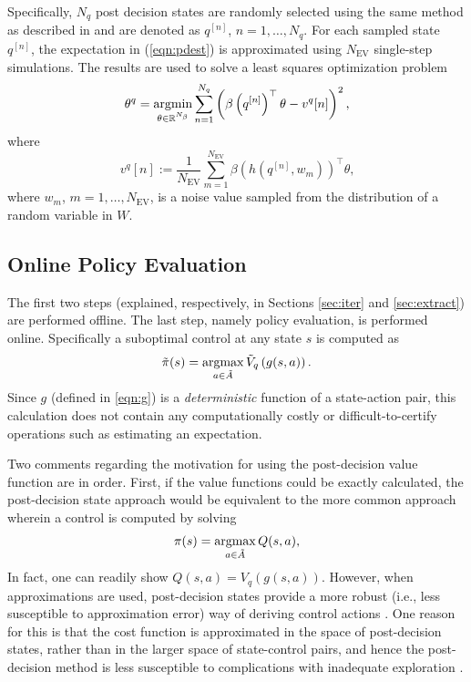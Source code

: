 Specifically, $N_q$ post decision states are randomly selected using the same method as described in  and are denoted as $q^{[n]}$, $n=1,\ldots, N_q$. For each sampled state $q^{[n]}$, the expectation in (\ref{eqn:pdest}) is approximated using $N_{\text{EV}}$ single-step simulations. The results are used to solve a least squares optimization problem
\begin{equation}
    \theta^q = \underset{\theta \in \reals^{N_{\beta}}}{\argmin} \sum_{n=1}^{N_q} \left( \beta \left(q^{[n]}\right)^\top \theta - v^q[n]\right) ^2 \text{,}
\end{equation}
where
\begin{equation}
    v^q[n] := \frac{1}{N_{\text{EV}}} \sum_{m=1}^{N_{\text{EV}}} \beta\left(h\left(q^{[n]},w_m\right)\right)^\top \theta \text{,}
\end{equation}
where $w_m$, $m=1,\dots,N_\text{EV}$, is a noise value sampled from the distribution of a random variable in $W$.


\subsection{Online Policy Evaluation} \label{sec:policy}

The first two steps (explained, respectively, in Sections \ref{sec:iter} and \ref{sec:extract}) are performed offline. The last step, namely policy evaluation, is performed online. Specifically a suboptimal control at any state $s$ is computed  as
\begin{equation}\label{eq:post}
    \tilde{\pi}(s) = \underset{a \in \tilde{A}}{\argmax} \, \tilde{V}_q\left(g(s,a)\right) \text{.}
\end{equation}
Since $g$ (defined in \eqref{eqn:g}) is a \emph{deterministic} function of a state-action pair, this calculation does not contain any computationally costly or difficult-to-certify operations such as estimating an expectation.

Two comments regarding the motivation for using the post-decision value function are in order. First, 
if the value functions could be exactly calculated, the post-decision state approach would be equivalent to the more common approach wherein a control is computed by solving
\begin{equation}
    \pi(s) = \underset{a \in \tilde{A}}{\argmax} \, Q(s,a) \text{,}
\end{equation}
In fact, one can readily show $Q(s,a) = V_q\left( g(s,a) \right)$. However, when approximations are used, post-decision states provide a more robust (i.e., less susceptible to approximation error) way of deriving control actions \cite{DB:05}. One reason for this is that the cost function is approximated in the space of post-decision states, rather than in the larger space of state-control pairs, and hence the post-decision method is less susceptible to complications with inadequate exploration \cite{DB:05}.

